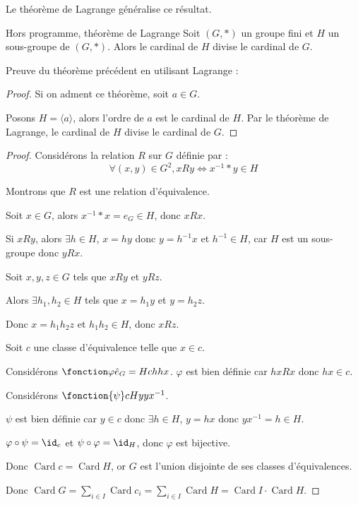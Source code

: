 Le théorème de Lagrange généralise ce résultat.

\begin{theoreme}{Hors programme, théorème de Lagrange}{}
    Soit $(G, \ast)$ un groupe fini et $H$ un sous-groupe de $(G, \ast)$.
    Alors le cardinal de $H$ divise le cardinal de $G$.
    
\end{theoreme}

Preuve du théorème précédent en utilisant Lagrange :
\begin{proof}
    Si on adment ce théorème, soit $a \in G$.

    Posons $H = \langle a \rangle$, alors l'ordre de $a$ est le cardinal de $H$.
    Par le théorème de Lagrange, le cardinal de $H$ divise le cardinal de $G$.
\end{proof}


\avspace {}


\svspace \begin{proof}
    Considérons la relation $R$ sur $G$ définie par :
    $$\forall (x, y) \in G^2, x R y \Leftrightarrow x^{-1} \ast y \in H$$

    Montrons que $R$ est une relation d'équivalence.

    
    \svspace Soit $x \in G$, alors $x^{-1} \ast x = e_G \in H$, donc $x R x$.
    

    \svspace Si $x R y$, alors $\exists h \in H$, $x = hy$ donc $y = h^{-1} x$ 
    et $h^{-1} \in H$, car $H$ est un sous-groupe donc $y R x$.


    \svspace Soit $x, y, z \in G$ tels que $x R y$ et $y R z$.

    Alors $\exists h_1, h_2 \in H$ tels que $x = h_1 y$ et $y = h_2 z$.

    Donc $x = h_1 h_2 z$ et $h_1 h_2 \in H$, donc $x R z$.

    
    \lvspace Soit $c$ une classe d'équivalence telle que $x \in c$. 

    Considérons $\fonction \varphi {\hat e_G = H}c h {h x}$. 
    $\varphi$ est bien définie car $hx R x$ donc $hx \in c$. 

    Considérons $\fonction{\psi} c H {y} {yx^{-1}}$.

    $\psi$ est bien définie car $y \in c$ donc $\exists h \in H$, $y = hx$ donc $yx^{-1} = h \in H$.

    $\varphi \circ \psi = \id_c$ et $\psi \circ \varphi = \id_H$, donc $\varphi$ est bijective. 

    Donc $\operatorname{Card} c = \operatorname{Card} H$, or $G$ est l'union disjointe de ses classes d'équivalences.

    Donc $\operatorname{Card} G = \sum_{i \in I} \operatorname{Card} c_i = \sum_{i \in I} \operatorname{Card} H = \operatorname{Card} I \cdot \operatorname{Card} H$.
\end{proof}

